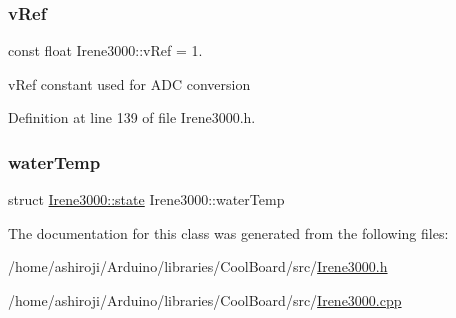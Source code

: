 \mbox{\label{class_irene3000_a018e7ff9bee57e6d2b298667a668ba7e}} 
\subsubsection{\texorpdfstring{v\+Ref}{vRef}}
{\footnotesize\ttfamily const float Irene3000\+::v\+Ref = 1.\hspace{0.3cm}{\ttfamily [private]}}

v\+Ref constant used for A\+DC conversion 

Definition at line 139 of file Irene3000.\+h.

\mbox{\label{class_irene3000_af05612c78c758ce9db316c75ad937130}} 
\subsubsection{\texorpdfstring{water\+Temp}{waterTemp}}
{\footnotesize\ttfamily struct \hyperlink{struct_irene3000_1_1state}{Irene3000\+::state}  Irene3000\+::water\+Temp\hspace{0.3cm}{\ttfamily [private]}}



The documentation for this class was generated from the following files\+:\begin{DoxyCompactItemize}
\item 
/home/ashiroji/\+Arduino/libraries/\+Cool\+Board/src/\hyperlink{_irene3000_8h}{Irene3000.\+h}\item 
/home/ashiroji/\+Arduino/libraries/\+Cool\+Board/src/\hyperlink{_irene3000_8cpp}{Irene3000.\+cpp}\end{DoxyCompactItemize}
